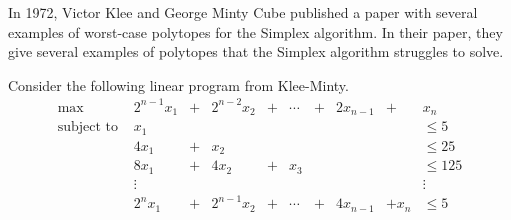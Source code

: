 In 1972, Victor Klee and George Minty Cube published a paper with several examples of worst-case polytopes for the Simplex algorithm.\cite{Klee1972}
In their paper, they give several examples of polytopes that the Simplex algorithm struggles to solve.

Consider the following linear program from Klee-Minty.
\begin{align*}
\text{max } & 2^{n-1}x_1 & + & 2^{n-2}x_2  & + & \cdots & + & 2x_{n-1} & + & x_n\\                     
\text{subject to } & x_1 &  &  &  &  &  &  &  &\leq 5\\
& 4x_1 & + & x_2 &  &  &  &  &  &\leq 25\\
& 8x_1 & + & 4x_2 & + & x_3 &  &  &  &\leq 125\\
& \vdots & &      &   &     &  &  &  &\vdots\\ 
& 2^n x_1 & + & 2^{n-1} x_2 & + & \cdots & + & 4x_{n-1} & + x_n &\leq 5\\
\end{align*}

% 
% 
% 
% 

